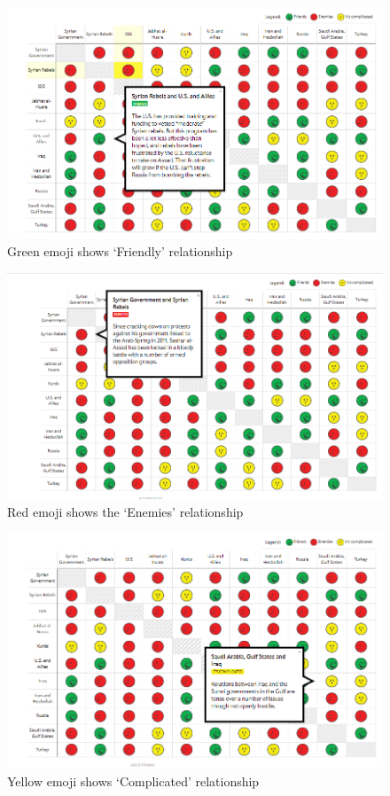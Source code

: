\documentclass[]{book}
\begin{document}
\begin{figure}
\centering
\includegraphics{images/img_syria_friendly.PNG}
\caption{Green emoji shows `Friendly' relationship}
\end{figure}

\begin{figure}
\centering
\includegraphics{images/img_syria_enemies.PNG}
\caption{Red emoji shows the `Enemies' relationship}
\end{figure}

\begin{figure}
\centering
\includegraphics{images/img_syria_complicated.PNG}
\caption{Yellow emoji shows `Complicated' relationship}
\end{figure}
\end{document}
